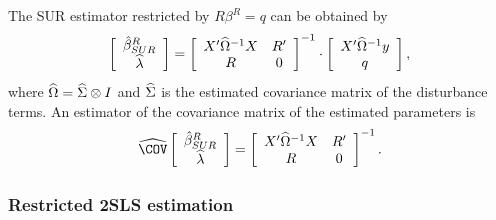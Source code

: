 The SUR estimator restricted by $R \beta^R = q$ can be obtained by
\begin{equation}
   \left[ \begin{array}{c}
      \hat{\beta}^R_{SUR} \\ \widehat{\lambda}
   \end{array} \right]
   =
   \left[ \begin{array}{cc}
      X' \widehat{\Omega}^{-1} X & R' \\
      R & 0
   \end{array} \right]^{-1}
   \cdot
   \left[ \begin{array}{c}
      X' \widehat{\Omega}^{-1} y \\ q
   \end{array} \right] ,
\end{equation}
where $\widehat{\Omega} = \widehat{\Sigma} \otimes I$ and
$\widehat{\Sigma}$ is the estimated covariance matrix of the disturbance terms.
An estimator of the covariance matrix of the estimated parameters is
\begin{equation}
   \COVHat
   \left[ \begin{array}{c}
      \bHat^R_{SUR} \\ \widehat{\lambda}
   \end{array} \right] 
   = 
   \left[ \begin{array}{cc}
      X' \OHat^{-1} X & R' \\
      R & 0
   \end{array} \right]^{-1} .
\end{equation}

\subsubsection{Restricted 2SLS estimation}

